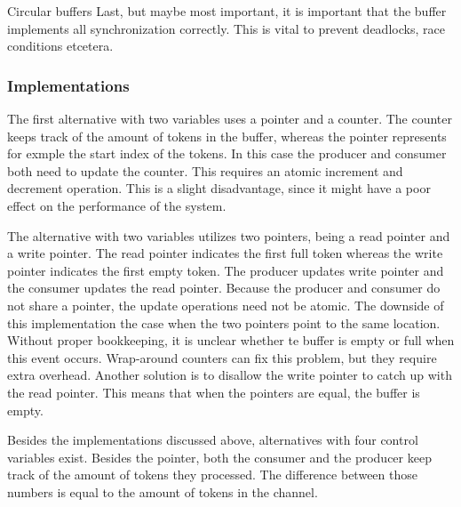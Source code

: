 \begin{homeworkProblem}
\begin{homeworkSection}{Circular buffers}
	Last, but maybe most important, it is important that the buffer implements all synchronization correctly. This is vital to prevent deadlocks, race conditions etcetera.
	
\subsubsection{Implementations}
	The first alternative with two variables uses a pointer and a counter. The counter keeps track of the amount of tokens in the buffer, whereas the pointer represents for exmple the start index of the tokens. 
	In this case the producer and consumer both need to update the counter. This requires an atomic increment and decrement operation. 
	This is a slight disadvantage, since it might have a poor effect on the performance of the system.
	
	The alternative with two variables utilizes two pointers, being a read pointer and a write pointer. 
	The read pointer indicates the first full token whereas the write pointer indicates the first empty token. 
	The producer updates write pointer and the consumer updates the read pointer. 
	Because the producer and consumer do not share a pointer, the update operations need not be atomic. The downside of this implementation 
	the case when the two pointers point to the same location. Without proper bookkeeping, it is unclear whether te buffer is empty or full when this event occurs. 
	Wrap-around counters can fix this problem, but they require extra overhead. Another solution is to disallow the write pointer to catch up with the read pointer. 
	This means that when the pointers are equal, the buffer is empty.

	Besides the implementations discussed above, alternatives with four control variables exist. 
	Besides the pointer, both the consumer and the producer keep track of the amount of tokens they processed. 
	The difference between those numbers is equal to the amount of tokens in the channel.
\end{homeworkSection}
\end{homeworkProblem}

